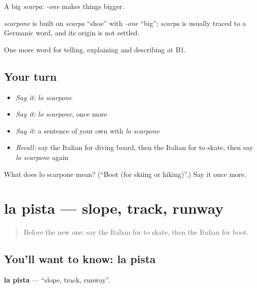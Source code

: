 A big \emph{scarpa}: \emph{-one} makes things bigger.

\begin{cousinweb}
\emph{scarpone} is built on \emph{scarpa} \textquotedblleft{}shoe\textquotedblright{} with \emph{-one} \textquotedblleft{}big\textquotedblright{}; \emph{scarpa} is usually traced to a Germanic word, and its origin is not settled.
\end{cousinweb}

\begin{grammarlens}[title={What you've built}]
One more word for telling, explaining and describing at B1.
\end{grammarlens}

\subsection*{Your turn}
\begin{itemize}
\raggedright
  \item \emph{Say it:} \emph{lo scarpone}
  \item \emph{Say it:} \emph{lo scarpone}, once more
  \item \emph{Say it:} a sentence of your own with \emph{lo scarpone}
  \item \emph{Recall:} say the Italian for diving board, then the Italian for to skate, then say \emph{lo scarpone} again
\end{itemize}

\begin{tcolorbox}[breakable,colback=teal!4,colframe=teal!35!black,title={Before you move on}]
What does lo scarpone mean? (\textquotedblleft{}Boot (for skiing or hiking)\textquotedblright{}.) Say it once more.
\end{tcolorbox}
\section[la pista]{la pista — slope, track, runway}

\label{lesson:IT-C515-pista}



\begin{quote}
Before the new one: say the Italian for to skate, then the Italian for boot.
\end{quote}

\subsection*{You'll want to know: la pista}
\textbf{la pista} — \textquotedblleft{}slope, track, runway\textquotedblright{}.

